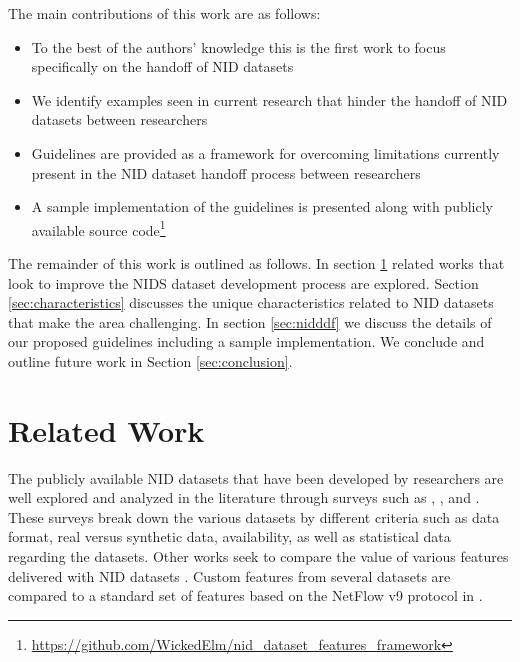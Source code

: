 \documentclass[sigconf, anonymous, screen, review]{acmart}
\begin{document}
The main contributions of this work are as follows:

\begin{itemize}
    \item To the best of the authors' knowledge this is the first work to focus specifically on the handoff of NID datasets %
    \item We identify examples seen in current research that hinder the handoff of NID datasets between researchers
    \item Guidelines are provided as a framework for overcoming limitations currently present in the NID dataset handoff process between researchers
    \item A sample implementation of the guidelines is presented along with publicly available source code\footnote{\url{https://github.com/WickedElm/nid\_dataset\_features\_framework}}
\end{itemize}

The remainder of this work is outlined as follows.
In section \ref{sec:related_work} related works that look to improve the NIDS dataset development process are explored.
Section \ref{sec:characteristics} discusses the unique characteristics related to NID datasets that make the area challenging.
In section \ref{sec:nidddf} we discuss the details of our proposed guidelines including a sample implementation.
We conclude and outline future work in Section \ref{sec:conclusion}.

\section{Related Work}\label{sec:related_work}

The publicly available NID datasets that have been developed by researchers are well explored and analyzed in the literature through surveys such as \cite{Chou2022}, \cite{ring2019survey}, and \cite{yang2022systematic}.
These surveys break down the various datasets by different criteria such as data format, real versus synthetic data, availability, as well as statistical data regarding the datasets.
Other works seek to compare the value of various features delivered with NID datasets \cite{7809531}.
Custom features from several datasets are compared to a standard set of features based on the NetFlow v9 protocol \cite{netflowv9format} in \cite{sarhan2020netflow}.
\end{document}
